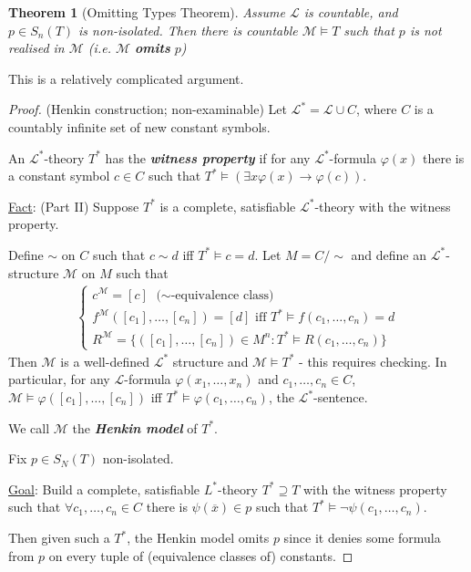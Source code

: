 \documentclass[]{article}
\theoremstyle{custhm}
\theoremstyle{cusdef}
\theoremstyle{custhm}
\theoremstyle{custhm}
\theoremstyle{custhm}
\theoremstyle{ex}
\theoremstyle{custhm}
\newtheorem*{theorem*}{Theorem}
\theoremstyle{cusdef}
\theoremstyle{remark}
\theoremstyle{remark}
\theoremstyle{numremark}
\newcommand{\ra}{\rightarrow}
\newcommand{\undf}[1]{\textit{\textbf{#1}}}
\renewcommand{\L}{\mathcal{L}}
\renewcommand{\it}[1]{\textit{#1}}
\newcommand{\M}{\mathcal{M}}
\renewcommand{\phi}{\varphi}
\renewcommand{\bar}{\overline}
\begin{document}
\begin{theorem*}[Omitting Types Theorem]
Assume $\L$ is countable, and $p \in S_n(T)$ is non-isolated. Then there is countable $\M\models T$ such that $p$ is not realised in $\M$ (\it{i.e.} $\M$ \undf{omits} $p$)
\end{theorem*}

This is a relatively complicated argument.

\begin{proof} (Henkin construction; non-examinable)
Let $\L^\ast = \L\cup C$, where $C$ is a countably infinite set of new constant symbols.

An $\L^\ast$-theory $T^\ast$ has the \undf{witness property} if for any $\L^\ast$-formula $\phi(x)$ there is a constant symbol $c\in C$ such that $T^\ast \models(\exists x\phi(x)\ra \phi(c))$.

\underline{Fact}: (Part II) Suppose $T^\ast$ is a complete, satisfiable $\L^\ast$-theory with the witness property.

Define $\sim$ on $C$ such that $c\sim d$ iff $T^\ast \models c = d$. Let $M = C/\sim$ and define an $\L^\ast$-structure $\M$ on $M$ such that
\begin{align*}
	\left\lbrace \begin{array}{ll} c^\M = [c] \textrm{ ($\sim$-equivalence class)} \\ f^\M([c_1],\dots,[c_n]) = [d] \textrm{ iff } T^\ast \models f(c_1,\dots,c_n) = d\\
	R^\M = \{([c_1],\dots,[c_n])\in M^n:T^\ast\models R(c_1,\dots,c_n)\} \end{array}\right.
\end{align*}
Then $\M$ is a well-defined $\L^\ast$ structure and $\M\models T^\ast$ - this requires checking. In particular, for any $\L$-formula $\phi(x_1,\dots,x_n)$ and $c_1,\dots,c_n\in C$, $\M\models \phi([c_1],\dots,[c_n])$ iff $T^\ast\models \phi(c_1,\dots,c_n)$, the $\L^\ast$-sentence.

We call $\M$ the \undf{Henkin model} of $T^\ast$.

Fix $p \in S_N(T)$ non-isolated.

\underline{Goal}: Build a complete, satisfiable $L^\ast$-theory $T^\ast\supseteq T$ with the witness property such that $\forall c_1,\dots,c_n\in C$ there is $\psi(\bar{x})\in p$ such that $T^\ast\models \neg\psi(c_1,\dots,c_n)$.

Then given such a $T^\ast$, the Henkin model omits $p$ since it denies some formula from $p$ on every tuple of (equivalence classes of) constants.


\end{proof}
\end{document}

